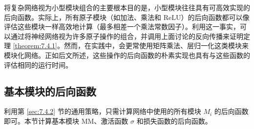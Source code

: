 \newpage
\begin{remark}\upshape
    \text{[计算效率和模块的粒度]} 
    
    \noindent 将复杂网络视为小型模块组合的主要根本目的是，小型模块往往具有可高效实现的后向函数。实际上，所有原子模块（如加法、乘法和 ReLU）的后向函数都可以像评估这些模块一样高效地计算（最多相差一个乘法常数因子）。利用这一事实，可以通过将神经网络视为许多原子操作的组合，并调用上面讨论的反向传播来证明定理 \ref{theorem:7.4.1}。然而，在实践中，会更常使用矩阵乘法、层归一化这类模块来模块化网络。正如后文所述，这些操作的后向函数的朴素实现也具有与这些函数的评估相同的运行时间。
\end{remark}


\subsection{基本模块的后向函数}\label{sec:7.4.3}

利用第 \ref{sec:7.4.2} 节的通用策略，只需计算网络中使用的所有模块 $M_i$ 的后向函数即可。本节计算基本模块 MM、激活函数 $\sigma$ 和损失函数的后向函数。


